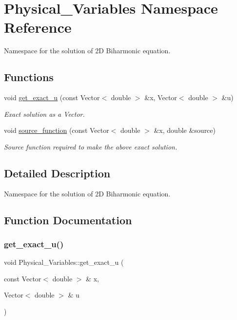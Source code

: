 \hypertarget{namespacePhysical__Variables}{}\section{Physical\+\_\+\+Variables Namespace Reference}
\label{namespacePhysical__Variables}


Namespace for the solution of 2D Biharmonic equation.  


\subsection*{Functions}
\begin{DoxyCompactItemize}
\item 
void \hyperlink{namespacePhysical__Variables_af90d0c580c57b1152fd1cc7046055031}{get\+\_\+exact\+\_\+u} (const Vector$<$ double $>$ \&x, Vector$<$ double $>$ \&u)
\begin{DoxyCompactList}\small\item\em Exact solution as a Vector. \end{DoxyCompactList}\item 
void \hyperlink{namespacePhysical__Variables_ae11027d76c5f512b7db6a1b6d17dc792}{source\+\_\+function} (const Vector$<$ double $>$ \&x, double \&source)
\begin{DoxyCompactList}\small\item\em Source function required to make the above exact solution. \end{DoxyCompactList}\end{DoxyCompactItemize}


\subsection{Detailed Description}
Namespace for the solution of 2D Biharmonic equation. 

\subsection{Function Documentation}
\mbox{\label{namespacePhysical__Variables_af90d0c580c57b1152fd1cc7046055031}} 
\subsubsection{\texorpdfstring{get\+\_\+exact\+\_\+u()}{get\_exact\_u()}}
{\footnotesize\ttfamily void Physical\+\_\+\+Variables\+::get\+\_\+exact\+\_\+u (\begin{DoxyParamCaption}\item[{const Vector$<$ double $>$ \&}]{x,  }\item[{Vector$<$ double $>$ \&}]{u }\end{DoxyParamCaption})}



